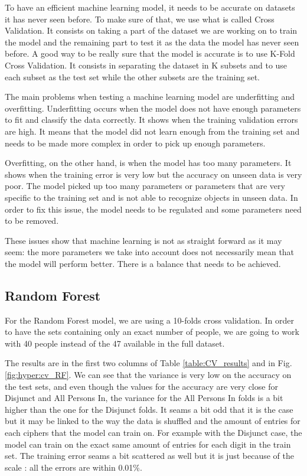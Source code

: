 \documentclass[conference]{IEEEtran}
\begin{document}
\textcolor{baptiste}{To have an efficient machine learning model, it needs to be accurate on datasets it has never seen before. To make sure of that, we use what is called Cross Validation. It consists on taking a part of the dataset we are working on to train the model and the remaining part to test it as the data the model has never seen before.
A good way to be really sure that the model is accurate is to use K-Fold Cross Validation. It consists in separating the dataset in K subsets and to use each subset as the test set while the other subsets are the training set. 
}


\textcolor{baptiste}{The main problems when testing a machine learning model are underfitting and overfitting. Underfitting occurs when the model does not have enough parameters to fit and classify the data correctly. It shows when the training validation errors are high. It means that the model did not learn enough from the training set and needs to be made more complex in order to pick up enough parameters.}

\textcolor{baptiste}{Overfitting, on the other hand, is when the model has too many parameters. It shows when the training error is very low but the accuracy on unseen data is very poor. The model picked up too many parameters or parameters that are very specific to the training set and is not able to recognize objects in unseen data. In order to fix this issue, the model needs to be regulated and some parameters need to be removed.}

\textcolor{baptiste}{These issues show that machine learning is not as straight forward as it may seem: the more parameters we take into account does not necessarily mean that the model will perform better. There is a balance that needs to be achieved.
}




\subsection{Random Forest}

\textcolor{baptiste}{For the Random Forest model, we are using a 10-folds cross validation. In order to have the sets containing only an exact number of people, we are going to work with 40 people instead of the 47 available in the full dataset.}

\textcolor{baptiste}{The results are in the first two columns of Table \ref{table:CV_results} and in Fig. \ref{fig:hyper:cv_RF}. We can see that the variance is very low on the accuracy on the test sets, and even though the values for the accuracy are very close for Disjunct and All Persons In, the variance for the All Persons In folds is a bit higher than the one for the Disjunct folds. It seams a bit odd that it is the case but it may be linked to the way the data is shuffled and the amount of entries for each ciphers that the model can train on. For example with the Disjunct case, the model can train on the exact same amount of entries for each digit in the train set. The training error seams a bit scattered as well but it is just because of the scale : all the errors are within 0.01\%.}
\end{document}
